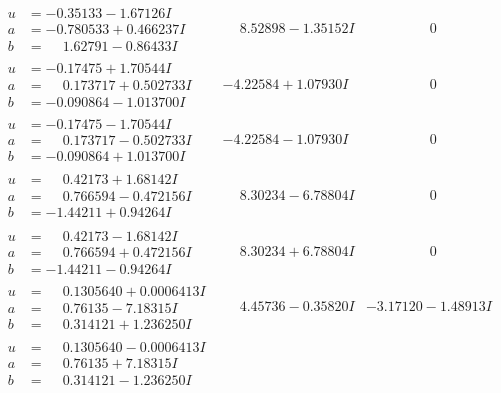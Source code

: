 \documentclass[1p]{elsarticle_modified}
\theoremstyle{definition}
\begin{document}
$$\begin{array}{c|c|c}
\begin{aligned}
u &= -0.35133 - 1.67126 I \\
a &= -0.780533 + 0.466237 I \\
b &= \phantom{-}1.62791 - 0.86433 I\end{aligned}
 & \phantom{-}8.52898 - 1.35152 I & \phantom{-0.000000 } 0 \\ \hline\begin{aligned}
u &= -0.17475 + 1.70544 I \\
a &= \phantom{-}0.173717 + 0.502733 I \\
b &= -0.090864 - 1.013700 I\end{aligned}
 & -4.22584 + 1.07930 I & \phantom{-0.000000 } 0 \\ \hline\begin{aligned}
u &= -0.17475 - 1.70544 I \\
a &= \phantom{-}0.173717 - 0.502733 I \\
b &= -0.090864 + 1.013700 I\end{aligned}
 & -4.22584 - 1.07930 I & \phantom{-0.000000 } 0 \\ \hline\begin{aligned}
u &= \phantom{-}0.42173 + 1.68142 I \\
a &= \phantom{-}0.766594 - 0.472156 I \\
b &= -1.44211 + 0.94264 I\end{aligned}
 & \phantom{-}8.30234 - 6.78804 I & \phantom{-0.000000 } 0 \\ \hline\begin{aligned}
u &= \phantom{-}0.42173 - 1.68142 I \\
a &= \phantom{-}0.766594 + 0.472156 I \\
b &= -1.44211 - 0.94264 I\end{aligned}
 & \phantom{-}8.30234 + 6.78804 I & \phantom{-0.000000 } 0 \\ \hline\begin{aligned}
u &= \phantom{-}0.1305640 + 0.0006413 I \\
a &= \phantom{-}0.76135 - 7.18315 I \\
b &= \phantom{-}0.314121 + 1.236250 I\end{aligned}
 & \phantom{-}4.45736 - 0.35820 I & -3.17120 - 1.48913 I \\ \hline\begin{aligned}
u &= \phantom{-}0.1305640 - 0.0006413 I \\
a &= \phantom{-}0.76135 + 7.18315 I \\
b &= \phantom{-}0.314121 - 1.236250 I\end{aligned}

\end{array}$$
\end{document}
